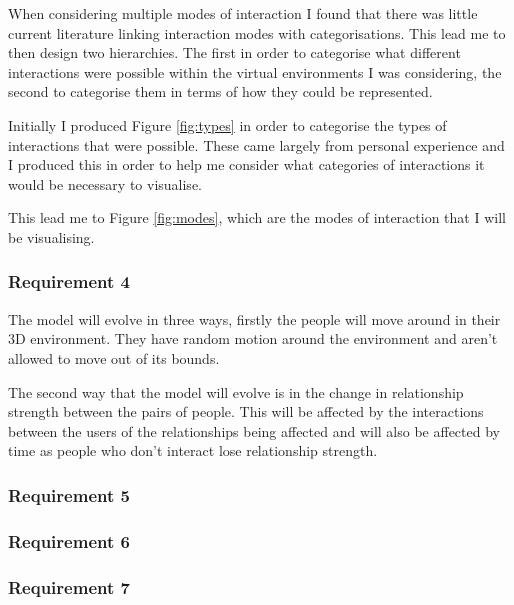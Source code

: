 \documentclass[12pt,a4paper]{article}
\begin{document}
When considering multiple modes of interaction I found that there was little current literature linking interaction modes with categorisations. This lead me to then design two hierarchies. The first in order to categorise what different interactions were possible within the virtual environments I was considering, the second to categorise them in terms of how they could be represented.

Initially I produced Figure \ref{fig:types} in order to categorise the types of interactions that were possible. These came largely from personal experience and I produced this in order to help me consider what categories of interactions it would be necessary to visualise.

This lead me to Figure \ref{fig:modes}, which are the modes of interaction that I will be visualising. 

\subsubsection{Requirement 4}
The model will evolve in three ways, firstly the people will move around in their 3D environment. They have random motion around the environment and aren't allowed to move out of its bounds.

The second way that the model will evolve is in the change in relationship strength between the pairs of people. This will be affected by the interactions between the users of the relationships being affected and will also be affected by time as people who don't interact lose relationship strength.

\subsubsection{Requirement 5}

\subsubsection{Requirement 6}

\subsubsection{Requirement 7}
\end{document}
